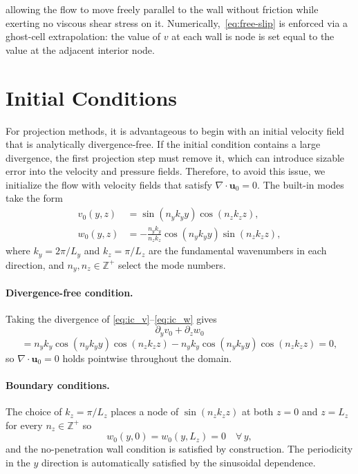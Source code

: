 allowing the flow to move freely parallel to the wall without friction while exerting no viscous shear stress on it. 
Numerically,~\eqref{eq:free-slip} is enforced via a ghost-cell extrapolation: the value of $v$ at each wall is node is set equal to the value at the adjacent interior node.

\section{Initial Conditions}\label{sec:ic}

For projection methods, it is advantageous to begin with an initial velocity field that is analytically divergence-free. If the initial condition contains a large divergence, the first projection step must remove it, which can introduce sizable error into the velocity and pressure fields. Therefore, to avoid this issue, we initialize the flow with velocity fields that satisfy $\nabla\cdot\mathbf{u}_0 = 0$. The built-in modes take the form
\begin{align}
    v_0(y,z) &= \sin(n_y k_y y)\cos(n_z k_z z), \label{eq:ic_v} \\
    w_0(y,z) &= -\frac{n_y k_y}{n_z k_z}\cos(n_y k_y y)\sin(n_z k_z z),
    \label{eq:ic_w}
\end{align}
where $k_y = 2\pi/L_y$ and $k_z = \pi/L_z$ are the fundamental wavenumbers in each direction, and $n_y, n_z \in \mathbb{Z}^+$ select the mode numbers. 

\paragraph{Divergence-free condition.}
Taking the divergence of \eqref{eq:ic_v}--\eqref{eq:ic_w} gives 
\begin{equation}
    \partial_y v_0 + \partial_z w_0
\end{equation}
\begin{equation}
    = n_y k_y \cos(n_y k_y y)\cos(n_z k_z z)
    - n_y k_y \cos(n_y k_y y)\cos(n_z k_z z) = 0,
\end{equation}
so $\nabla\cdot\mathbf{u}_0 = 0$ holds pointwise throughout the domain.

\paragraph{Boundary conditions.}
The choice of $k_z = \pi/L_z$ places a node of $\sin(n_z k_z z)$ at both $z = 0$ and $z = L_z$ for every $n_z \in \mathbb{Z}^+$ so
\begin{equation}
    w_0(y, 0) = w_0(y, L_z) = 0 \quad \forall\, y,
\end{equation}
and the no-penetration wall condition is satisfied by construction. The periodicity in the $y$ direction is automatically satisfied by the sinusoidal dependence.

